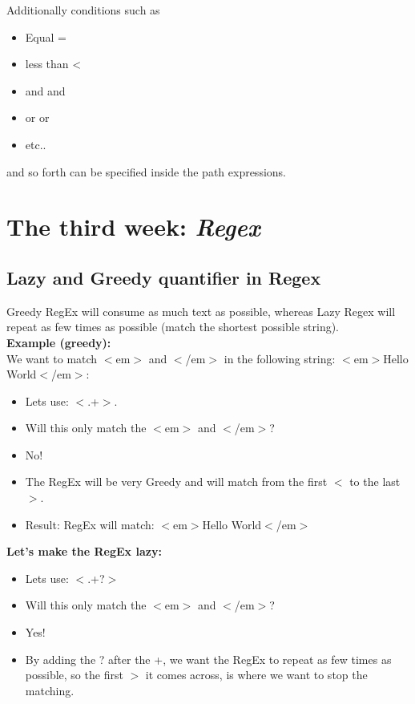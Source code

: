 \documentclass[11pt]{article}
\begin{document}
Additionally conditions such as

\begin{itemize}
  \item Equal { = }
  \item less than { < }
  \item  and { and }
  \item or { or }
  \item etc..
\end{itemize}

and so forth can be specified inside the path expressions.

\newpage
\section {The third week: \textit{Regex}}
\subsection{Lazy and Greedy quantifier in Regex}
Greedy RegEx will consume as much text as possible, whereas Lazy Regex will repeat as few times as possible (match the shortest possible string). \\

\textbf{Example (greedy):} \\
We want to match $<$em$>$ and $<$/em$>$ in the following string: $<$em$>$Hello World$<$/em$>$:

\begin{itemize}
  \item Lets use: $<$.+$>$.
  \item Will this only match the $<$em$>$ and $<$/em$>$?
  \item No!
  \item The RegEx will be very Greedy and will match from the first $<$ to the last $>$.
  \item Result: RegEx will match: $<$em$>$Hello World$<$/em$>$
\end{itemize}

\textbf{Let's make the RegEx lazy:}
\begin{itemize}
  \item Lets use: $<$.+?$>$
  \item Will this only match the $<$em$>$ and $<$/em$>$?
  \item Yes!
  \item By adding the ? after the +, we want the RegEx to repeat as few times as possible, so the first $>$ it comes across, is where we want to stop the matching.
\end{itemize}
\end{document}
